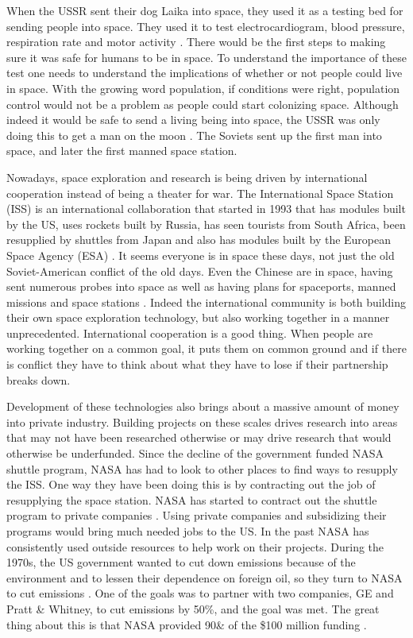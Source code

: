 \documentclass[a4paper,12pt]{article}
\begin{document}
When the USSR sent their dog Laika into space, they used it as a testing bed for sending people into space. They used it to test electrocardiogram, blood pressure, respiration rate and motor activity \autocite{west2001}. There would be the first steps to making sure it was safe for humans to be in space. To understand the importance of these test one needs to understand the implications of whether or not people could live in space. With the growing word population, if conditions were right, population control would not be a problem as people could start colonizing space. Although indeed it would be safe to send a living being into space, the USSR was only doing this to get a man on the moon \autocite{west2001}. The Soviets sent up the first man into space, and later the first manned space station.

Nowadays, space exploration and research is being driven by international cooperation instead of being a theater for war. The International Space Station (ISS) is an international collaboration that started in 1993 that has modules built by the US, uses rockets built by Russia, has seen tourists from South Africa, been resupplied by shuttles from Japan and also has modules built by the European Space Agency (ESA) \autocite{funk2014}. It seems everyone is in space these days, not just the old Soviet-American conflict of the old days. Even the Chinese are in space, having sent numerous probes into space as well as having plans for spaceports, manned missions and space stations \autocite{jolly2013}. Indeed the international community is both building their own space exploration technology, but also working together in a manner unprecedented. International cooperation is a good thing. When people are working together on a common goal, it puts them on common ground and if there is conflict they have to think about what they have to lose if their partnership breaks down. 

Development of these technologies also brings about a massive amount of money into private industry. Building projects on these scales drives research into areas that may not have been researched otherwise or may drive research that would otherwise be underfunded. Since the decline of the government funded NASA shuttle program, NASA has had to look to other places to find ways to resupply the ISS. One way they have been doing this is by contracting out the job of resupplying the space station. NASA has started to contract out the shuttle program to private companies \autocite{woodsbrian}. Using private companies and subsidizing their programs would bring much needed jobs to the US. In the past NASA has consistently used outside resources to help work on their projects. During the 1970s, the US government wanted to cut down emissions because of the environment and to lessen their dependence on foreign oil, so they turn to NASA to cut emissions \autocite{reddy2013}. One of the goals was to partner with two companies, GE and Pratt \& Whitney, to cut emissions by 50\%, and the goal was met. The great thing about this is that NASA provided 90\& of the \$100 million funding \autocite{reddy2013}.
\end{document}
